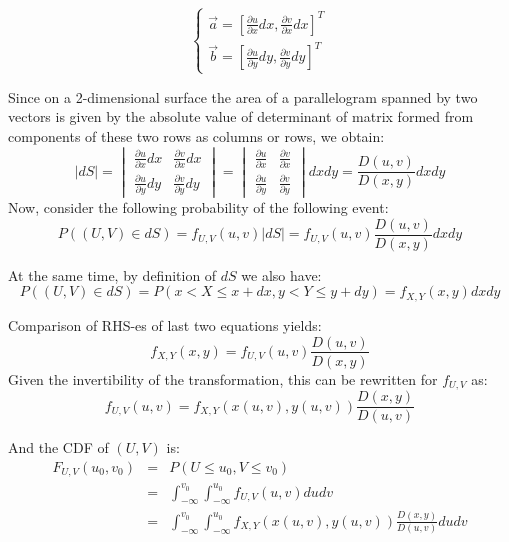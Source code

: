 \documentclass[12pt]{article}
\begin{document}
\begin{equation*}
\left\{
\begin{aligned}
\vec{a} = \left[
\frac{\partial u}{\partial x} dx, 
\frac{\partial v}{\partial x} dx
\right]^{T} \\ 
\vec{b} = \left[
\frac{\partial u}{\partial y} dy, 
\frac{\partial v}{\partial y} dy
\right]^{T}
\end{aligned}
\right.
\end{equation*}

Since on a 2-dimensional surface the area of a parallelogram spanned by 
two vectors is given by the absolute value of determinant of matrix formed from
components of these two rows as columns or rows, we obtain:
\begin{equation*}
|dS| = \begin{vmatrix}
\frac{\partial u}{\partial x} dx & \frac{\partial v}{\partial x} dx \\
\frac{\partial u}{\partial y} dy & \frac{\partial v}{\partial y} dy
\end{vmatrix} = 
\begin{vmatrix}
\frac{\partial u}{\partial x} & \frac{\partial v}{\partial x} \\
\frac{\partial u}{\partial y} & \frac{\partial v}{\partial y}
\end{vmatrix} dx dy =
\frac{D(u, v)}{D(x, y)}dxdy
\end{equation*}
Now, consider the following probability of the following event:
\begin{equation*}
P((U, V) \in dS) = 
f_{U, V}(u, v) |dS| = f_{U, V}(u, v) 
\frac{D(u, v)}{D(x, y)}dxdy
\end{equation*}

At the same time, by definition of $dS$ we also have:
\begin{equation*}
P((U, V) \in dS) = P(x < X \leq x + dx, y < Y \leq y + dy) = f_{X, Y}(x, y) dxdy
\end{equation*}

Comparison of RHS-es of last two equations yields:
\begin{equation*}
f_{X,Y}(x,y) = f_{U, V}(u,v) \frac{D(u, v)}{D(x, y)}
\end{equation*}
Given the invertibility of the transformation, this can be rewritten for $f_{U, V}$ as:
\begin{equation*}
f_{U, V}(u, v) = f_{X, Y}(x(u, v), y(u, v)) \frac{D(x, y)}{D(u, v)}
\end{equation*}

And the CDF of $(U, V)$ is:
\begin{eqnarray*}
F_{U, V}(u_0, v_0) &=& P(U \leq u_0, V \leq v_0) \\ 
&=& \int_{-\infty}^{v_0} \int_{-\infty}^{u_0} f_{U, V}(u, v) du dv \\
&=& \int_{-\infty}^{v_0} \int_{-\infty}^{u_0} f_{X, Y}(x(u, v), y(u, v)) 
\frac{D(x, y)}{D(u, v)} du dv
\end{eqnarray*}
\end{document}
